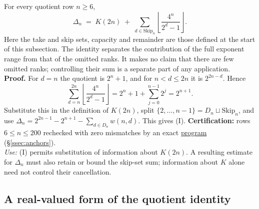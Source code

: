 \begin{thm}
\label{thm:master-identity}
For every quotient row $n \ge 6$,
\begin{equation*}
\Delta_n \;=\; K(2n) \;+\; \sum_{d \in \mathrm{Skip}_n} \left\lfloor \frac{4^n}{2^d-1} \right\rfloor.
\tag{I}
\end{equation*}
Here the take and skip sets, capacity and remainder are those defined
at the start of this subsection.  The identity separates the contribution
of the full exponent range from that of the omitted ranks.  It makes no
claim that there are few omitted ranks; controlling their sum is a
separate part of any application.\\
\textbf{Proof.} For $d=n$ the quotient is $2^n+1$, and for
$n<d\le2n$ it is $2^{2n-d}$.  Hence
\[
 \sum_{d=n}^{2n}\left\lfloor\frac{4^n}{2^d-1}\right\rfloor
 =2^n+1+\sum_{j=0}^{n-1}2^j=2^{n+1}.
\]
Substitute this in the definition of $K(2n)$, split
$\{2,\ldots,n-1\}=D_n\sqcup\mathrm{Skip}_n$, and use
$\Delta_n=2^{2n-1}-2^{n+1}-\sum_{d\in D_n}w(n,d)$.
This gives (I).  \textbf{Certification:} rows $6\le n\le200$
rechecked with zero mismatches by an exact
\href{https://github.com/wcook04/plectis-erdos/blob/f757115e03bebe5c04431a147da559015c680a37/research/experiments/erdos257/check_master_identity.py}{program}
(\S\ref{ssec:anchors}).\\
\textit{Use:} (I) permits substitution of information about $K(2n)$.
A resulting estimate for $\Delta_n$ must also retain or bound the
skip-set sum; information about $K$ alone need not control their
cancellation.
\end{thm}

\subsection{A real-valued form of the quotient identity}

